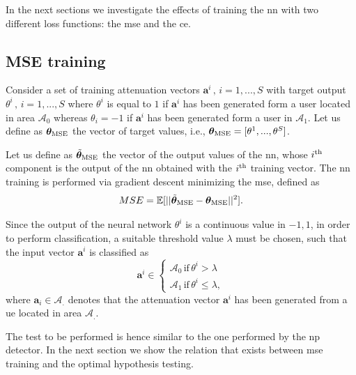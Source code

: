 \documentclass[draftcls,onecolumn,12pt]{IEEEtran}
\begin{document}
In the next sections we investigate the effects of training the \ac{nn} with two different loss functions: the \ac{mse} and the \ac{ce}.

\subsection{ MSE training}
Consider a set of training attenuation vectors $\bm{a}^i \, , \, i=1,...,S$ with target output $\theta^i \, , \, i=1,...,S $ where $\theta^i$ is equal to $1$ if $\bm{a}^i$ has been generated form a user located in area $\mathcal{A}_0$ whereas $\theta_i=-1$ if $\bm{a}^i$ has been generated form a user in $\mathcal{A}_1$. Let us define as $\bm{\theta}_{\rm MSE}$ the vector of target values, i.e., $\bm{\theta}_{\rm MSE}=[\theta^1,...,\theta^S]$.

Let us define as $\tilde{\bm{\theta}}_{\rm MSE}$ the vector of the output values of the \ac{nn}, whose $i^{\rm th}$ component is the output of the \ac{nn} obtained with the $i^{\rm th}$ training vector. The \ac{nn} training is performed via gradient descent minimizing the \ac{mse}, defined as
\begin{equation}
MSE = \mathbb{E}[||\tilde{\bm{\theta}}_{\rm MSE}-\bm{\theta}_{\rm MSE}||^2].
\end{equation}

Since the output of the neural network $\theta^i$ is a continuous value in ${-1,1}$, in order to perform classification, a suitable threshold value $\lambda$ must be chosen, such that the input vector $\bm{a}^i$ is classified as
\begin{equation}
\bm{a}^i \in
\begin{cases}
\mathcal{A}_0 \, \text{if} \, \theta^i > \lambda \\
\mathcal{A}_1 \, \text{if} \, \theta^i \le \lambda, 
\end{cases}
\end{equation}
where $\bm{a}_i \in \mathcal{A}_.$ denotes that the attenuation vector $\bm{a}^i$ has been generated from a \ac{ue} located in area $\mathcal{A}_.$.

The test to be performed is hence similar to the one performed by the \ac{np} detector. In the next section we show the relation that exists between \ac{mse} training and the optimal hypothesis testing. 
\end{document}
